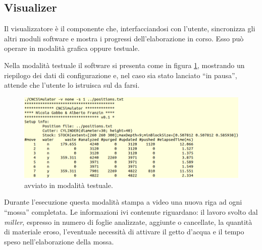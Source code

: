 \subsection{Visualizer}
Il visualizzatore è il componente che, interfacciandosi con l'utente, sincronizza gli altri moduli software e mostra i progressi dell'elaborazione in corso. Esso può operare in modalità grafica oppure testuale.

Nella modalità testuale il software si presenta come in figura \ref{fig:visualizer_textmode}, mostrando un riepilogo dei dati di configurazione e, nel caso sia stato lanciato ``in pausa'', attende che l'utente lo istruisca sul da farsi.
\begin{figure}[htp]
	\centering
	\includegraphics[width=.85\textwidth]{img/visualizer_textmode}
	\caption{ avviato in modalità testuale.}
	\label{fig:visualizer_textmode}
\end{figure}
Durante l'esecuzione questa modalità stampa a video una nuova riga ad ogni ``mossa'' completata. Le informazioni ivi contenute riguardano: il lavoro svolto dal \emph{miller}, espresso in numero di foglie analizzate, aggiunte o cancellate, la quantità di materiale eroso, l'eventuale necessità di attivare il getto d'acqua e il tempo speso nell'elaborazione della mossa.

